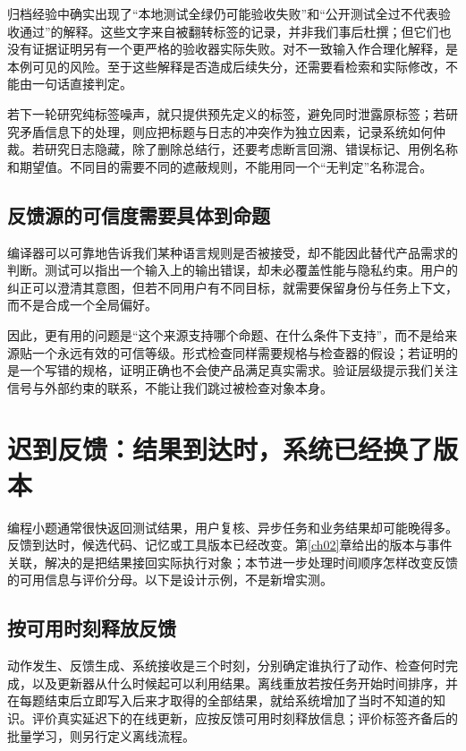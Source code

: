 归档经验中确实出现了“本地测试全绿仍可能验收失败”和“公开测试全过不代表验收通过”的解释。这些文字来自被翻转标签的记录，并非我们事后杜撰；但它们也没有证据证明另有一个更严格的验收器实际失败。对不一致输入作合理化解释，是本例可见的风险。至于这些解释是否造成后续失分，还需要看检索和实际修改，不能由一句话直接判定。

若下一轮研究纯标签噪声，就只提供预先定义的标签，避免同时泄露原标签；若研究矛盾信息下的处理，则应把标题与日志的冲突作为独立因素，记录系统如何仲裁。若研究日志隐藏，除了删除总结行，还要考虑断言回溯、错误标记、用例名称和期望值。不同目的需要不同的遮蔽规则，不能用同一个“无判定”名称混合。

\subsection{反馈源的可信度需要具体到命题}

编译器可以可靠地告诉我们某种语言规则是否被接受，却不能因此替代产品需求的判断。测试可以指出一个输入上的输出错误，却未必覆盖性能与隐私约束。用户的纠正可以澄清其意图，但若不同用户有不同目标，就需要保留身份与任务上下文，而不是合成一个全局偏好。

因此，更有用的问题是“这个来源支持哪个命题、在什么条件下支持”，而不是给来源贴一个永远有效的可信等级。形式检查同样需要规格与检查器的假设；若证明的是一个写错的规格，证明正确也不会使产品满足真实需求。验证层级提示我们关注信号与外部约束的联系，不能让我们跳过被检查对象本身。

\section{迟到反馈：结果到达时，系统已经换了版本}
\label{sec:ch04-delay}

编程小题通常很快返回测试结果，用户复核、异步任务和业务结果却可能晚得多。反馈到达时，候选代码、记忆或工具版本已经改变。第\ref{ch02}章给出的版本与事件关联，解决的是把结果接回实际执行对象；本节进一步处理时间顺序怎样改变反馈的可用信息与评价分母。以下是设计示例，不是新增实测。

\subsection{按可用时刻释放反馈}

动作发生、反馈生成、系统接收是三个时刻，分别确定谁执行了动作、检查何时完成，以及更新器从什么时候起可以利用结果。离线重放若按任务开始时间排序，并在每题结束后立即写入后来才取得的全部结果，就给系统增加了当时不知道的知识。评价真实延迟下的在线更新，应按反馈可用时刻释放信息；评价标签齐备后的批量学习，则另行定义离线流程。

